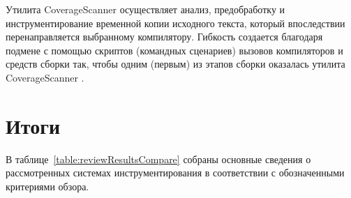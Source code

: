 Утилита CoverageScanner осуществляет анализ, предобработку и инструментирование временной копии исходного текста, который впоследствии перенаправляется выбранному компилятору. Гибкость создается благодаря подмене с помощью скриптов (командных сценариев) вызовов компиляторов и средств сборки так, чтобы одним (первым) из этапов сборки оказалась утилита CoverageScanner \cite{reviewFrog}.

\section{Итоги}

В таблице~\ref{table:reviewResultsCompare} собраны основные сведения о рассмотренных системах инструментирования в соответствии с обозначенными критериями обзора.
\begin{table}[htbp]
  \centering
  \captionsetup{skip=5pt}
  \caption{Основные характеристики систем инструментирования}
\end{table}

